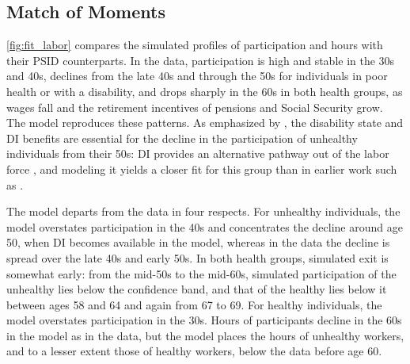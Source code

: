 \begin{table}[!htbp]
\centering
\caption{Estimated Preference Parameters}\label{tab:estimates}
\small

\end{table}

\subsection{Match of Moments}

\autoref{fig:fit_labor} compares the simulated profiles of participation and hours with their PSID counterparts. In the data, participation is high and stable in the 30s and 40s, declines from the late 40s and through the 50s for individuals in poor health or with a disability, and drops sharply in the 60s in both health groups, as wages fall and the retirement incentives of pensions and Social Security grow. The model reproduces these patterns. As emphasized by \citet{Yu2024}, the disability state and DI benefits are essential for the decline in the participation of unhealthy individuals from their 50s: DI provides an alternative pathway out of the labor force \citep{Maestas2013,French2014,Low2015,Li2018}, and modeling it yields a closer fit for this group than in earlier work such as \citet{french2005effects}.

The model departs from the data in four respects. For unhealthy individuals, the model overstates participation in the 40s and concentrates the decline around age 50, when DI becomes available in the model, whereas in the data the decline is spread over the late 40s and early 50s. In both health groups, simulated exit is somewhat early: from the mid-50s to the mid-60s, simulated participation of the unhealthy lies below the confidence band, and that of the healthy lies below it between ages 58 and 64 and again from 67 to 69. For healthy individuals, the model overstates participation in the 30s. %
Hours of participants decline in the 60s in the model as in the data, but the model places the hours of unhealthy workers, and to a lesser extent those of healthy workers, below the data before age 60.

